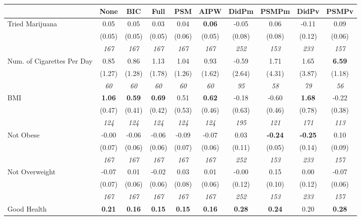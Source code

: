 \begin{tabular}{l c c c c c c c c c}
\toprule
 & None & BIC & Full & PSM & AIPW & DidPm & PSMPm & DidPv & PSMPv \\
\midrule
Tried Marijuana & 0.05 & 0.05 & 0.03 & 0.04 & \textbf{0.06} & -0.05 & 0.06 & -0.11 & 0.09 \\
& (0.05) & (0.05) & (0.05) & (0.06) & (0.05) & (0.08) & (0.08) & (0.12) & (0.06) \\
& \textit{ 167 } & \textit{ 167 } & \textit{ 167 } & \textit{ 167 } & \textit{ 167 } & \textit{ 252 } & \textit{ 153 } & \textit{ 233 } & \textit{ 157 } \\
Num. of Cigarettes Per Day & 0.85 & 0.86 & 1.13 & 1.04 & 0.93 & -0.59 & 1.71 & 1.65 & \textbf{6.59} \\
& (1.27) & (1.28) & (1.78) & (1.26) & (1.62) & (2.64) & (4.31) & (3.87) & (1.18) \\
& \textit{ 60 } & \textit{ 60 } & \textit{ 60 } & \textit{ 60 } & \textit{ 60 } & \textit{ 95 } & \textit{ 58 } & \textit{ 79 } & \textit{ 56 } \\
BMI & \textbf{ 1.06 } & \textbf{ 0.59 } & \textbf{ 0.69 } & 0.51 & \textbf{0.62} & -0.18 & -0.60 & \textbf{ 1.68 } & -0.22 \\
& (0.47) & (0.41) & (0.42) & (0.53) & (0.46) & (0.63) & (0.46) & (0.78) & (0.38) \\
& \textit{ 124 } & \textit{ 124 } & \textit{ 124 } & \textit{ 124 } & \textit{ 124 } & \textit{ 195 } & \textit{ 121 } & \textit{ 171 } & \textit{ 113 } \\
Not Obese & -0.00 & -0.06 & -0.06 & -0.09 & -0.07 & 0.03 & \textbf{-0.24} & \textbf{ -0.25 } & 0.10 \\
& (0.07) & (0.06) & (0.06) & (0.07) & (0.06) & (0.11) & (0.05) & (0.14) & (0.09) \\
& \textit{ 167 } & \textit{ 167 } & \textit{ 167 } & \textit{ 167 } & \textit{ 167 } & \textit{ 252 } & \textit{ 153 } & \textit{ 233 } & \textit{ 157 } \\
Not Overweight & -0.07 & 0.01 & -0.02 & 0.03 & 0.01 & -0.00 & 0.15 & 0.00 & -0.07 \\
& (0.07) & (0.06) & (0.06) & (0.08) & (0.06) & (0.12) & (0.10) & (0.12) & (0.06) \\
& \textit{ 167 } & \textit{ 167 } & \textit{ 167 } & \textit{ 167 } & \textit{ 167 } & \textit{ 252 } & \textit{ 153 } & \textit{ 233 } & \textit{ 157 } \\
Good Health & \textbf{ 0.21 } & \textbf{ 0.16 } & \textbf{ 0.15 } & \textbf{0.15} & \textbf{0.16} & \textbf{ 0.28 } & \textbf{0.24} & 0.20 & \textbf{0.28} \\

\end{tabular}
